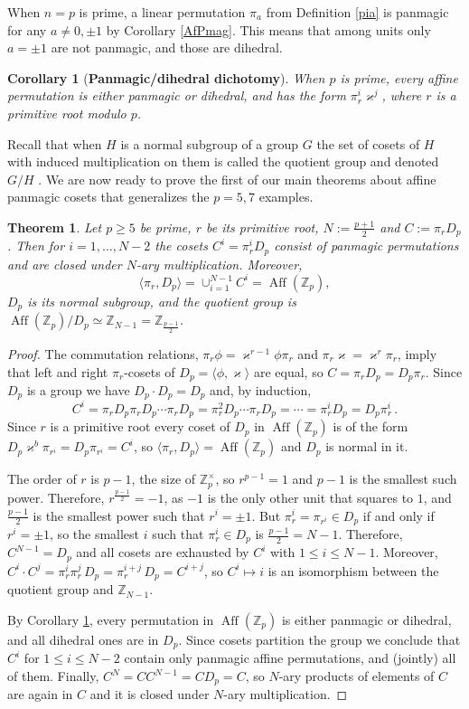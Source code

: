 \documentclass[11pt]{article}
\theoremstyle{plain}
\newtheorem{theorem}{Theorem}
\newtheorem{corollary}{Corollary}
\theoremstyle{definition}
\newcommand{\+}[1]{{#1}^\times}
\def\Aff{\operatorname{Aff}}
\def\Z{{\mathbb Z}}
\def\k{{\varkappa}}
\begin{document}
When $n=p$ is prime, a linear permutation $\pi_a$ from Definition \ref{pia} is panmagic for any $a\neq 0,\pm1$ by Corollary \ref{AfPmag}. This means that among units only $a=\pm 1$ are not panmagic, and those are dihedral. 
\begin{corollary}[{\bf Panmagic/dihedral dichotomy}]\label{affinegeneration} When $p$ is prime, every affine permutation is either panmagic or dihedral, and has the form $\pi_r^i\k^j$, where $r$ is a primitive root modulo $p$. 
\end{corollary}
Recall that when $H$ is a normal subgroup of a group $G$ the set of cosets of $H$ with induced multiplication on them is called the quotient group and denoted $G/H$ \cite{Gallian}. We are now ready to prove the first of our main theorems about affine panmagic cosets that generalizes the $p=5,7$ examples. 
\begin{theorem}\label{primetheory} Let $p\geq5$ be prime, $r$ be its primitive root, $N:=\frac{p+1}{2}$ and $C:=\pi_rD_p$. Then for $i=1,\dots,N-2$ the cosets $C^i=\pi_r^iD_p$  consist of panmagic permutations and are closed under $N$-ary multiplication. Moreover, 
$$\langle \pi_r,D_p\rangle=\cup_{i=1}^{N-1}C^i=\Aff(\Z_p),$$
$D_p$ is its normal subgroup, and the quotient group is $\Aff(\Z_p)/D_p\simeq\Z_{N-1}=\Z_{\frac{p-1}2}$. 
\end{theorem}
\begin{proof}
The commutation relations, $\pi_r\phi=\k^{r-1}\phi\pi_r$ and $\pi_r\k=\k^r\pi_r$, imply that left and right $\pi_r$-cosets of $D_p=\langle\phi,\k\rangle$ are equal, so $C=\pi_rD_p=D_p\pi_r$. Since $D_p$ is a group we have $D_p\cdot D_p=D_p$ and, by induction, 
$$
C^i=\pi_rD_p\pi_rD_p\cdots\pi_rD_p =\pi_r^2D_p\cdots\pi_rD_p=\cdots=\pi_r^iD_p=D_p\pi_r^i\,.
$$ 
Since $r$ is a primitive root every coset of $D_p$ in $\Aff(\Z_p)$ is of the form $D_p\k^b\pi_{r^i}=D_p\pi_{r^i}=C^i$, so $\langle \pi_r,D_p\rangle=\Aff(\Z_p)$ and $D_p$ is normal in it. 

The order of $r$ is $p-1$, the size of $\+{\Z}_p$, so $r^{p-1}=1$ and $p-1$ is the smallest such power. Therefore, $r^{\frac{p-1}{2}}=-1$, as $-1$ is the only other unit that squares to $1$, and $\frac{p-1}{2}$ is the smallest power such that $r^i=\pm1$. But $\pi_r^i=\pi_{r^i}\in D_p$ if and only if $r^i=\pm1$, so the smallest $i$ such that $\pi_r^i\in D_p$ is $\frac{p-1}{2}=N-1$. Therefore, $C^{N-1}=D_p$ and all cosets are exhausted by $C^i$ with $1\leq i\leq N-1$. Moreover, $C^i\cdot C^j=\pi_r^i\pi_r^j\,D_p=\pi_r^{i+j}\,D_p=C^{i+j}$, so  $C^i\mapsto i$ is an isomorphism between the quotient group and $\Z_{N-1}$.

By Corollary \ref{affinegeneration}, every permutation in $\Aff(\Z_p)$ is either panmagic or dihedral, and all dihedral ones are in $D_p$. Since cosets partition the group we conclude that $C^i$ for $1\leq i\leq N-2$ contain only panmagic affine permutations, and (jointly) all of them. 
Finally, $C^N=CC^{N-1}=CD_p=C$, so $N$-ary products of elements of $C$ are again in $C$ and it is closed under $N$-ary multiplication.
\end{proof}
\end{document}
